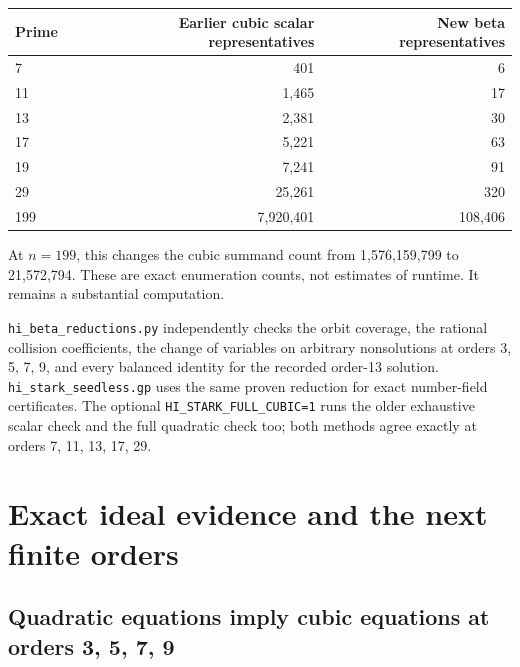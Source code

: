 \documentclass[11pt,reqno]{amsart}
\theoremstyle{plain}
\begin{document}
\begin{center}\small
\begin{tabular}{@{}lrr@{}}
\toprule
Prime & Earlier cubic scalar representatives & New beta representatives \\
\midrule
7 & 401 & 6 \\
11 & 1,465 & 17 \\
13 & 2,381 & 30 \\
17 & 5,221 & 63 \\
19 & 7,241 & 91 \\
29 & 25,261 & 320 \\
199 & 7,920,401 & 108,406 \\
\bottomrule
\end{tabular}
\end{center}

At \(n=199\), this changes the cubic summand count from
1,576,159,799 to 21,572,794. These are exact enumeration counts,
not estimates of runtime. It remains a substantial computation.

\texttt{hi\_\allowbreak beta\_\allowbreak reductions.py} independently checks the orbit coverage,
the rational collision coefficients, the change of variables on
arbitrary nonsolutions at orders 3, 5, 7, 9, and every balanced
identity for the recorded order-13 solution. \texttt{hi\_\allowbreak stark\_\allowbreak seedless.gp}
uses the same proven reduction for exact number-field certificates.
The optional \texttt{HI\_\allowbreak STARK\_\allowbreak FULL\_\allowbreak CUBIC=1} runs the older exhaustive scalar
check and the full quadratic check too; both methods agree exactly
at orders 7, 11, 13, 17, 29.

\section{Exact ideal evidence and the next finite orders}\label{sec:35}

\subsection{Quadratic equations imply cubic equations at orders 3, 5, 7, 9}\label{sec:35.1}
\end{document}
